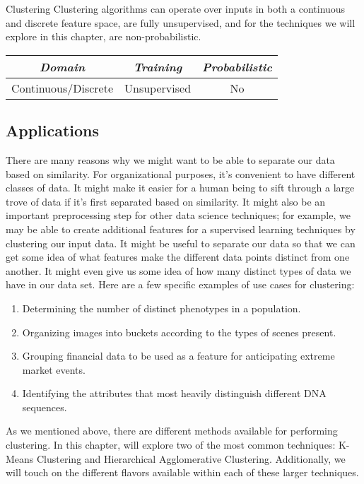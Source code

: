 \begin{mlcube}{Clustering}
Clustering algorithms can operate over inputs in both a continuous and discrete feature space, are fully unsupervised, and for the techniques we will explore in this chapter, are non-probabilistic.
\begin{center}
    \begin{tabular}{c|c|c}
    \textit{\textbf{Domain}} & \textit{\textbf{Training}} & \textit{\textbf{Probabilistic}} \\
    \hline
    Continuous/Discrete & Unsupervised & No \\
    \end{tabular}
\end{center}
\end{mlcube}

\subsection{Applications}
There are many reasons why we might want to be able to separate our data based on similarity. For organizational purposes, it's convenient to have different classes of data. It might make it easier for a human being to sift through a large trove of data if it's first separated based on similarity. It might also be an important preprocessing step for other data science techniques; for example, we may be able to create additional features for a supervised learning techniques by clustering our input data. It might be useful to separate our data so that we can get some idea of what features make the different data points distinct from one another. It might even give us some idea of how many distinct types of data we have in our data set. Here are a few specific examples of use cases for clustering:

\begin{enumerate}
    \item Determining the number of distinct phenotypes in a population.
    \item Organizing images into buckets according to the types of scenes present.
    \item Grouping financial data to be used as a feature for anticipating extreme market events.
    \item Identifying the attributes that most heavily distinguish different DNA sequences.
\end{enumerate}

As we mentioned above, there are different methods available for performing clustering. In this chapter, will explore two of the most common techniques: K-Means Clustering and Hierarchical Agglomerative Clustering. Additionally, we will touch on the different flavors available within each of these larger techniques.

